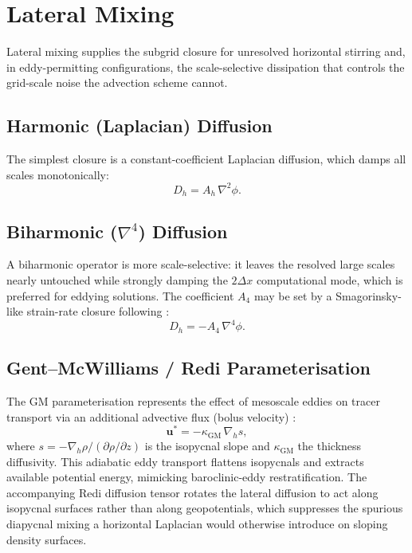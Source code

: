 \documentclass[11pt,twoside]{report}
\newcommand{\pp}{\partial}
\newcommand{\vect}[1]{\bm{#1}}
\newcommand{\grad}{\nabla}
\begin{document}
\section{Lateral Mixing}
\label{sec:lateral}

Lateral mixing supplies the subgrid closure for unresolved horizontal
stirring and, in eddy-permitting configurations, the scale-selective
dissipation that controls the grid-scale noise the advection scheme
cannot.

\subsection{Harmonic (Laplacian) Diffusion}

The simplest closure is a constant-coefficient Laplacian diffusion, which
damps all scales monotonically:
\begin{equation}
  D_h = A_h\,\nabla^2\phi.
\end{equation}

\subsection{Biharmonic ($\nabla^4$) Diffusion}

A biharmonic operator is more scale-selective: it leaves the resolved
large scales nearly untouched while strongly damping the $2\Delta x$
computational mode, which is preferred for eddying solutions.  The
coefficient $A_4$ may be set by a Smagorinsky-like strain-rate closure
following \citet{GriffiesHallberg2000}:
\begin{equation}
  D_h = -A_4\,\nabla^4\phi.
\end{equation}

\subsection{Gent--McWilliams / Redi Parameterisation}

The GM parameterisation represents the effect of mesoscale eddies on
tracer transport via an additional advective flux (bolus velocity)
\citep{GM1990}:
\begin{equation}
  \vect{u}^* = -\kappa_{\mathrm{GM}}\,\grad_h s,
\end{equation}
where $s=-\grad_h\rho/(\pp\rho/\pp z)$ is the isopycnal slope and
$\kappa_{\mathrm{GM}}$ the thickness diffusivity.  This adiabatic eddy
transport flattens isopycnals and extracts available potential energy,
mimicking baroclinic-eddy restratification.  The accompanying Redi
diffusion tensor \citep{Redi1982} rotates the lateral diffusion to act
along isopycnal surfaces rather than along geopotentials, which suppresses
the spurious diapycnal mixing a horizontal Laplacian would otherwise
introduce on sloping density surfaces.
\end{document}
